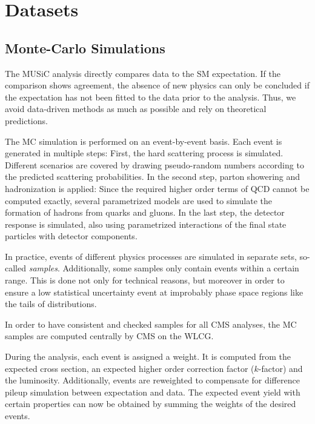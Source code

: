 
\chapter{Datasets}
\section{Monte-Carlo Simulations}
The \ac{MUSiC} analysis directly compares data to the \ac{SM} expectation. If the comparison shows agreement, the absence of new physics can only be concluded if the expectation has not been fitted to the data prior to the analysis. Thus, we avoid data-driven methods as much as possible and rely on theoretical predictions.

The \ac{MC} simulation is performed on an event-by-event basis. Each event is generated in multiple steps: First, the hard scattering process is simulated. Different scenarios are covered by drawing pseudo-random numbers according to the predicted scattering probabilities. In the second step, parton showering and hadronization is applied: Since the required higher order terms of \ac{QCD} cannot be computed exactly, several parametrized models are used to simulate the formation of hadrons from quarks and gluons. In the last step, the detector response is simulated, also using parametrized interactions of the final state particles with detector components.

In practice, events of different physics processes are simulated in separate sets, so-called \emph{samples}. Additionally, some samples only contain events within a certain \pT range. This is done not only for technical reasons, but moreover in order to ensure a low statistical uncertainty event at improbably phase space regions like the tails of distributions.

In order to have consistent and checked samples for all \ac{CMS} analyses, the \ac{MC} samples are computed centrally by \ac{CMS} on the \ac{WLCG}.

During the analysis, each event is assigned a weight. It is computed from the expected cross section, an expected higher order correction factor ($k$-factor) and the luminosity. 
Additionally, events are reweighted to compensate for difference pileup simulation between expectation and data. 
The expected event yield with certain properties can now be obtained by summing the weights of the desired events.

